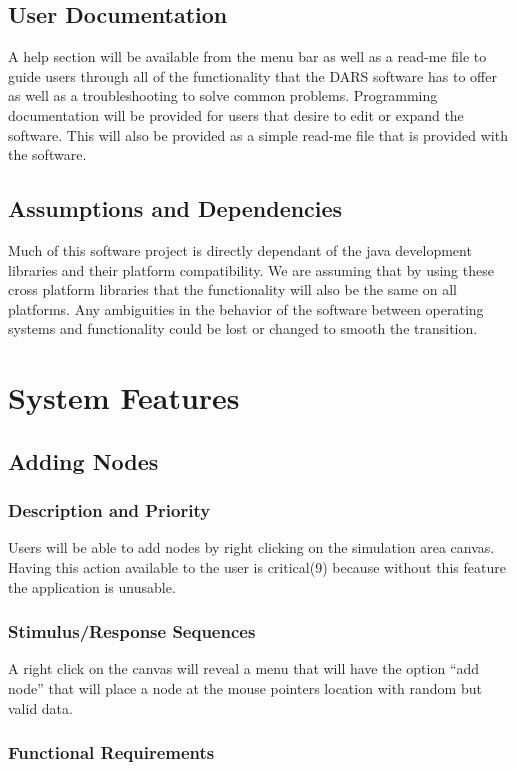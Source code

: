 \documentclass[a4paper,11pt,titlepage]{article}
\begin{document}
\subsection{User Documentation}
A help section will be available from the menu bar as well as a read-me file to guide users
through all of the functionality that the DARS software has to offer as well as a troubleshooting
to solve common problems. Programming documentation will be provided for users
that desire to edit or expand the software. This will also be provided as a simple read-me file
that is provided with the software.
\subsection{Assumptions and Dependencies}
Much of this software project is directly dependant of the java development libraries and their
platform compatibility. We are assuming that by using these cross platform libraries that the
functionality will also be the same on all platforms. Any ambiguities in the behavior of the
software between operating systems and functionality could be lost or changed to smooth the
transition.

\section{System Features}
\subsection{Adding Nodes}
\subsubsection{Description and Priority}
Users will be able to add nodes by right clicking on the simulation area canvas.
Having this action available to the user is critical(9) because without this feature the
application is unusable.
\subsubsection{Stimulus/Response Sequences}
A right click on the canvas will reveal a menu that will have the option “add node” that
will place a node at the mouse pointers location with random but valid data.
\subsubsection{Functional Requirements}
\end{document}
